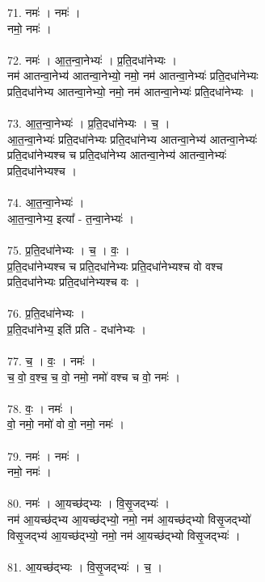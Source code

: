 71. नमः॑ । नमः॑ ।\\
नमो॒ नमः॑ ।\\
\\
72. नमः॑ । आ॒त॒न्वा॒नेभ्यः॑ । प्र॒ति॒दधा॑नेभ्यः ।\\
नम॑ आतन्वा॒नेभ्य॑ आतन्वा॒नेभ्यो॒ नमो॒ नम॑ आतन्वा॒नेभ्यः॑ प्रति॒दधा॑नेभ्यः\\
प्रति॒दधा॑नेभ्य आतन्वा॒नेभ्यो॒ नमो॒ नम॑ आतन्वा॒नेभ्यः॑ प्रति॒दधा॑नेभ्यः ।\\
\\
73. आ॒त॒न्वा॒नेभ्यः॑ । प्र॒ति॒दधा॑नेभ्यः । च॒ ।\\
आ॒त॒न्वा॒नेभ्यः॑ प्रति॒दधा॑नेभ्यः प्रति॒दधा॑नेभ्य आतन्वा॒नेभ्य॑ आतन्वा॒नेभ्यः॑\\
प्रति॒दधा॑नेभ्यश्च च प्रति॒दधा॑नेभ्य आतन्वा॒नेभ्य॑ आतन्वा॒नेभ्यः॑\\
प्रति॒दधा॑नेभ्यश्च ।\\
\\
74. आ॒त॒न्वा॒नेभ्यः॑ ।\\
आ॒त॒न्वा॒नेभ्य॒ इत्या᳚ - त॒न्वा॒नेभ्यः॑ ।\\
\\
75. प्र॒ति॒दधा॑नेभ्यः । च॒ । वः॒ ।\\
प्र॒ति॒दधा॑नेभ्यश्च च प्रति॒दधा॑नेभ्यः प्रति॒दधा॑नेभ्यश्च वो वश्च\\
प्रति॒दधा॑नेभ्यः प्रति॒दधा॑नेभ्यश्च वः ।\\
\\
76. प्र॒ति॒दधा॑नेभ्यः ।\\
प्र॒ति॒दधा॑नेभ्य॒ इति॑ प्रति - दधा॑नेभ्यः ।\\
\\
77. च॒ । वः॒ । नमः॑ ।\\
च॒ वो॒ व॒श्च॒ च॒ वो॒ नमो॒ नमो॑ वश्च च वो॒ नमः॑ ।\\
\\
78. वः॒ । नमः॑ ।\\
वो॒ नमो॒ नमो॑ वो वो॒ नमो॒ नमः॑ ।\\
\\
79. नमः॑ । नमः॑ ।\\
नमो॒ नमः॑ ।\\
\\
80. नमः॑ । आ॒यच्छ॑द्भ्यः । वि॒सृ॒जद्भ्यः॑ ।\\
नम॑ आ॒यच्छ॑द्भ्य आ॒यच्छ॑द्भ्यो॒ नमो॒ नम॑ आ॒यच्छ॑द्भ्यो विसृ॒जद्भ्यो॑\\
विसृ॒जद्भ्य॑ आ॒यच्छ॑द्भ्यो॒ नमो॒ नम॑ आ॒यच्छ॑द्भ्यो विसृ॒जद्भ्यः॑ ।\\
\\
81. आ॒यच्छ॑द्भ्यः । वि॒सृ॒जद्भ्यः॑ । च॒ ।\\
